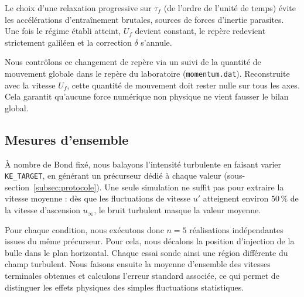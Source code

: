 Le choix d'une relaxation progressive sur $\tau_f$ (de l'ordre de l'unité de temps) évite les accélérations d'entraînement brutales, sources de forces d'inertie parasites. Une fois le régime établi atteint, $U_f$ devient constant, le repère redevient strictement galiléen et la correction $\delta$ s'annule.

Nous contrôlons ce changement de repère via un suivi de la quantité de mouvement globale dans le repère du laboratoire (\texttt{momentum.dat}). Reconstruite avec la vitesse $U_f$, cette quantité de mouvement doit rester nulle sur tous les axes. Cela garantit qu'aucune force numérique non physique ne vient fausser le bilan global.

\subsection{Mesures d'ensemble}
\label{subsec:ensemble}

À nombre de Bond fixé, nous balayons l'intensité turbulente en faisant varier \texttt{KE\_TARGET}, en générant un précurseur dédié à chaque valeur (sous-section~\ref{subsec:protocole}). Une seule simulation ne suffit pas pour extraire la vitesse moyenne : dès que les fluctuations de vitesse $u'$ atteignent environ $50\,\%$ de la vitesse d'ascension $u_\infty$, le bruit turbulent masque la valeur moyenne.

Pour chaque condition, nous exécutons donc $n=5$ réalisations indépendantes issues du même précurseur. Pour cela, nous décalons la position d'injection de la bulle dans le plan horizontal. Chaque essai sonde ainsi une région différente du champ turbulent. Nous faisons ensuite la moyenne d'ensemble des vitesses terminales obtenues et calculons l'erreur standard associée, ce qui permet de distinguer les effets physiques des simples fluctuations statistiques.
